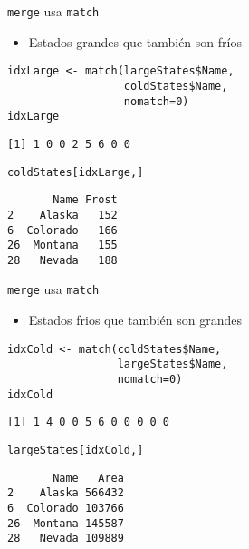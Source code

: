 \documentclass[xcolor={usenames,svgnames,dvipsnames}]{beamer}
\begin{document}
\begin{frame}[fragile,label=sec-5-3]{\texttt{merge} usa \texttt{match}}
 \begin{itemize}
\item Estados grandes que también son fríos
\end{itemize}
\lstset{language=R,label= ,caption= ,numbers=none}
\begin{lstlisting}
idxLarge <- match(largeStates$Name,
                  coldStates$Name,
                  nomatch=0)
idxLarge
\end{lstlisting}

\begin{verbatim}
[1] 1 0 0 2 5 6 0 0
\end{verbatim}

\lstset{language=R,label= ,caption= ,numbers=none}
\begin{lstlisting}
coldStates[idxLarge,]
\end{lstlisting}

\begin{verbatim}
       Name Frost
2    Alaska   152
6  Colorado   166
26  Montana   155
28   Nevada   188
\end{verbatim}
\end{frame}

\begin{frame}[fragile,label=sec-5-4]{\texttt{merge} usa \texttt{match}}
 \begin{itemize}
\item Estados frios que también son grandes
\end{itemize}
\lstset{language=R,label= ,caption= ,numbers=none}
\begin{lstlisting}
idxCold <- match(coldStates$Name,
                 largeStates$Name,
                 nomatch=0)
idxCold
\end{lstlisting}

\begin{verbatim}
[1] 1 4 0 0 5 6 0 0 0 0 0
\end{verbatim}

\lstset{language=R,label= ,caption= ,numbers=none}
\begin{lstlisting}
largeStates[idxCold,]
\end{lstlisting}

\begin{verbatim}
       Name   Area
2    Alaska 566432
6  Colorado 103766
26  Montana 145587
28   Nevada 109889
\end{verbatim}
\end{frame}
\end{document}
